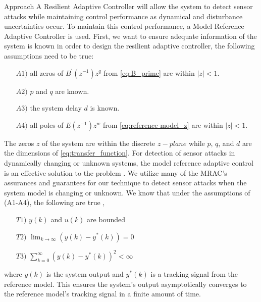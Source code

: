 \begin{section}{Approach}
A Resilient Adaptive Controller  will allow the system to detect sensor attacks while maintaining control performance as dynamical and disturbance uncertainties occur. To maintain this control performance, a Model Reference Adaptive Controller is used. First, we want to ensure adequate information of the system is known  in order to design the resilient adaptive controller, the following assumptions need to be true:
	\begin{enumerate}[leftmargin=3\parindent]
	\item[$A1)$] all zeros of $B^{'}(z^{-1})z^q$ from \eqref{eq:B_prime} are within $|z|<1$. 
	\item[$A2)$] $p$ and $q$ are known. 
	\item[$A3)$] the system delay $d$ is known.
	\item[$A4)$] all poles of $E(z^{-1})z^w$ from \eqref{eq:reference model_z} are within $|z|<1$.
	\end{enumerate}
The zeros $z$ of the system are within the discrete $z-plane$ while $p$, $q$, and $d$ are the dimensions of \eqref{eq:transfer_function}. For detection of sensor attacks in dynamically changing or unknown systems, the model reference adaptive control is an effective solution to the problem . We utilize  many of the MRAC's assurances and guarantees for our technique to detect sensor attacks when the system model is changing or unknown. We know that under the assumptions of (A1-A4), the following are true \cite{tao2003adaptive},
	\begin{enumerate}[label=(\roman*),leftmargin=3\parindent]
	\label{assumtions_ensure}
	\item[$T1)$] $y(k)$ and $u(k)$ are bounded 
	\item[$T2)$] $\lim_{k\to\infty}(y(k)-y^*(k))=0$
	\label{Truth2}
	\item[$T3)$] $\sum_{k=0}^\infty(y(k)-y^*(k))^2<\infty$
	\end{enumerate}
where $y(k)$ is the system output and $y^*(k)$ is a tracking signal from the reference model. This ensures the system's output asymptotically converges to the reference model's tracking signal in a finite amount of time. 


\end{section}
